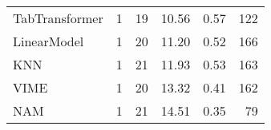 \begin{tabular}{lrrrrr}
TabTransformer     &                  1 &  19 &  10.56 &                           0.57 &   122 \\
LinearModel        &                  1 &  20 &  11.20 &                           0.52 &   166 \\
KNN                &                  1 &  21 &  11.93 &                           0.53 &   163 \\
VIME               &                  1 &  20 &  13.32 &                           0.41 &   162 \\
NAM                &                  1 &  21 &  14.51 &                           0.35 &    79 \\
\bottomrule
\end{tabular}
